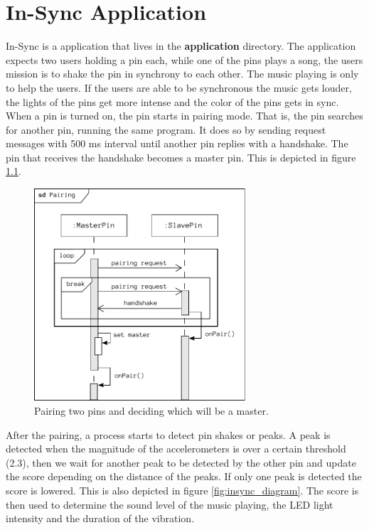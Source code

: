 \documentclass[a4paper, twoside, final]{book}%
\begin{document}
\chapter{In-Sync Application}

In-Sync is a application that lives in the \textbf{application} directory. The application expects two users holding a pin each, while one of the pins plays a song, the users mission is to 
shake the pin in synchrony to each other. The music playing is only to help the users. If the users are able to be synchronous the music gets louder, the lights of the pins get more intense and the color of the pins gets in sync.\\

When a pin is turned on, the pin starts in pairing mode. That is, the pin searches for another 
pin, running the same program. It does so by sending request messages with 500 ms interval until another 
pin replies with a handshake. The pin that receives the handshake becomes a master pin. This is depicted in figure \ref{fig:pairing_diagram}.

\begin{figure}[H]
  \centering
    \includegraphics[width=0.7\textwidth]{figures/pairing_diagram.pdf}
  \caption{Pairing two pins and deciding which will be a master.}
  \label{fig:pairing_diagram}
\end{figure}

After the pairing, a process starts to detect pin shakes or peaks. A peak is detected when the magnitude of 
the accelerometers is over a certain threshold (2.3), then we wait for another peak to be detected by the other pin and update the score depending on the distance of the peaks. If only one peak is detected the score is lowered. This is also depicted in figure \ref{fig:insync_diagram}. The score is then used to determine the sound level of the music playing, the LED light intensity and the duration of the vibration.
\end{document}

